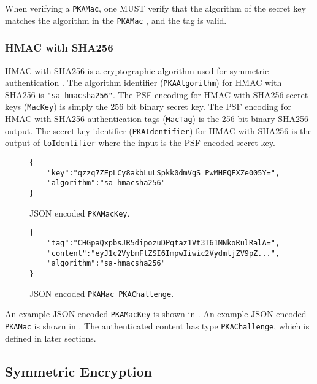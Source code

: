 \documentclass{article}
\newcommand{\jp}[1]{\textcolor{blue}{JP: #1}}
\begin{document}
When verifying a \texttt{PKAMac}, one MUST verify that the algorithm of the secret key matches the algorithm in the \texttt{PKAMac}
, and the tag is valid. 


\subsubsection{HMAC with SHA256}

HMAC with SHA256 is a cryptographic algorithm used for symmetric authentication \cite{rfc4868}. %
The algorithm identifier (\texttt{PKAAlgorithm}) for HMAC with SHA256 is \texttt{"sa-hmacsha256"}. 
The PSF encoding for HMAC with SHA256 secret keys (\texttt{MacKey}) is simply the 256 bit binary secret key. 
The PSF encoding for HMAC with SHA256 authentication tags (\texttt{MacTag}) is the 256 bit binary SHA256 output. 
The secret key identifier (\texttt{PKAIdentifier}) for HMAC with SHA256 is the output of \texttt{toIdentifier} where the input is the PSF encoded secret key. 

\begin{figure}
\begin{lstlisting}
{
    "key":"qzzq7ZEpLCy8akbLuLSpkk0dmVgS_PwMHEQFXZe005Y=",
    "algorithm":"sa-hmacsha256"
}
\end{lstlisting}
\caption{JSON encoded \texttt{PKAMacKey}.}
\label{code:pkamackey}
\end{figure}

\begin{figure}
\begin{lstlisting}
{
    "tag":"CHGpaQxpbsJR5dipozuDPqtaz1Vt3T61MNkoRulRalA=",
    "content":"eyJ1c2VybmFtZSI6ImpwIiwic2VydmljZV9pZ...",
    "algorithm":"sa-hmacsha256"
}
\end{lstlisting}
\caption{JSON encoded \texttt{PKAMac PKAChallenge}.}
\label{code:pkamacchallenge}
\end{figure}


An example JSON encoded \texttt{PKAMacKey} is shown in . 
An example JSON encoded \texttt{PKAMac} is shown in . 
The authenticated content has type \texttt{PKAChallenge}, which is defined in later sections. 



\subsection{Symmetric Encryption}
\end{document}
